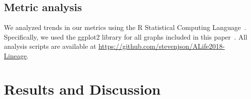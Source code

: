 \documentclass[letterpaper]{article}
\begin{document}
\subsection{Metric analysis}

We analyzed trends in our metrics using the R Statistical Computing Language~\citep{r_core_team_r:_2017}. Specifically, we used the ggplot2 library for all graphs included in this paper~\citep{wickham_ggplot2:_2009}. All analysis scripts are available at \url{https://github.com/stevenjson/ALife2018-Lineage}.


\section{Results and Discussion}


\end{document}
